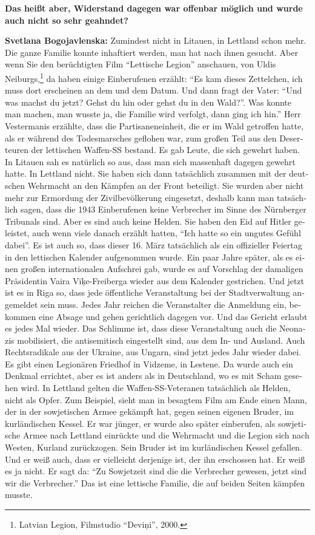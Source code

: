 \begin{otherlanguage}{ngerman}
\textbf{Das heißt aber, Widerstand dagegen war offenbar möglich und wurde auch nicht so sehr geahndet?}

\textbf{Svetlana Bogojavlenska:} Zumindest nicht in Litauen, in Lettland schon mehr. Die ganze Familie konnte inhaftiert werden, man hat nach ihnen gesucht. Aber wenn Sie den berüchtigten Film "`Lettische Legion"' anschauen, von Uldis Neiburgs,\footnote{Latvian Legion, Filmstudio "`Deviņi"', 2000.} da haben einige Einberufenen erzählt: "`Es kam dieses Zettelchen, ich muss dort erscheinen an dem und dem Datum. Und dann fragt der Vater: "`Und was machst du jetzt? Gehst du hin oder gehst du in den Wald?"'. Was konnte man machen, man wusste ja, die Familie wird verfolgt, dann ging ich hin."' Herr Vestermanis erzählte, dass die Partisaneneinheit, die er im Wald getroffen hatte, als er während des Todesmarsches geflohen war, zum großen Teil aus den Deserteuren der lettischen Waffen-SS bestand. Es gab Leute, die sich gewehrt haben. In Litauen sah es natürlich so aus, dass man sich massenhaft dagegen gewehrt hatte. In Lettland nicht. Sie haben sich dann tatsächlich zusammen mit der deutschen Wehrmacht an den Kämpfen an der Front beteiligt. Sie wurden aber nicht mehr zur Ermordung der Zivilbevölkerung eingesetzt, deshalb kann man tatsächlich sagen, dass die 1943 Einberufenen keine Verbrecher im Sinne des Nürnberger Tribunals sind. Aber es sind auch keine Helden. Sie haben den Eid auf Hitler geleistet, auch wenn viele danach erzählt hatten, "`Ich hatte so ein ungutes Gefühl dabei"'. Es ist auch so, dass dieser 16. März tatsächlich als ein offizieller Feiertag in den lettischen Kalender aufgenommen wurde. Ein paar Jahre später, als es einen großen internationalen Aufschrei gab, wurde es auf Vorschlag der damaligen Präsidentin Vaira Vīķe-Freiberga wieder aus dem Kalender gestrichen. Und jetzt ist es in Riga so, dass jede öffentliche Veranstaltung bei der Stadtverwaltung angemeldet sein muss. Jedes Jahr reichen die Veranstalter die Anmeldung ein, bekommen eine Absage und gehen gerichtlich dagegen vor. Und das Gericht erlaubt es jedes Mal wieder. Das Schlimme ist, dass diese Veranstaltung auch die Neonazis mobilisiert, die antisemitisch eingestellt sind, aus dem In- und Ausland. Auch Rechtsradikale aus der Ukraine, aus Ungarn, sind jetzt jedes Jahr wieder dabei.
Es gibt einen Legionären Friedhof in Vidzeme, in Lestene. Da wurde auch ein Denkmal errichtet, aber es ist anders als in Deutschland, wo es mit Scham gesehen wird. In Lettland gelten die Waffen-SS-Veteranen tatsächlich als Helden, nicht als Opfer. Zum Beispiel, sieht man in besagtem Film am Ende einen Mann, der in der sowjetischen Armee gekämpft hat, gegen seinen eigenen Bruder, im kurländischen Kessel. Er war jünger, er wurde also später einberufen, als sowjetische Armee nach Lettland einrückte und die Wehrmacht und die Legion sich nach Westen, Kurland zurückzogen. Sein Bruder ist im kurländischen Kessel gefallen. Und er weiß auch, dass er vielleicht derjenige ist, der ihn erschossen hat. Er weiß es ja nicht. Er sagt da: "`Zu Sowjetzeit sind die die Verbrecher gewesen, jetzt sind wir die Verbrecher."' Das ist eine lettische Familie, die auf beiden Seiten kämpfen musste.

\end{otherlanguage}
